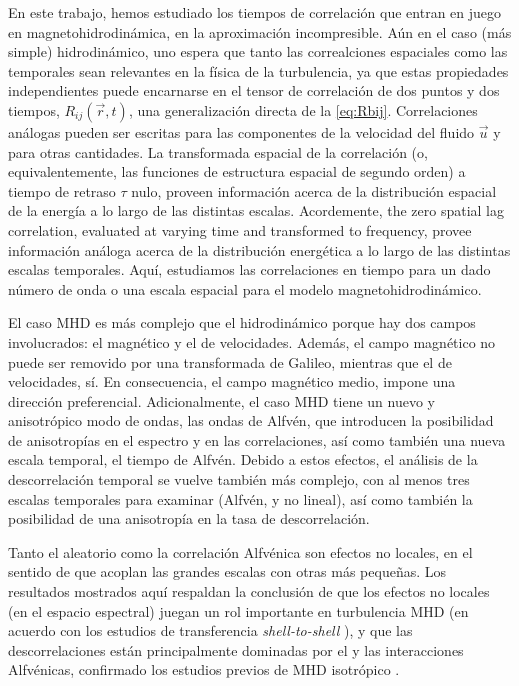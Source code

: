 En este trabajo, hemos estudiado los tiempos de correlación que entran
en juego en magnetohidrodinámica, en la aproximación
incompresible. Aún en el caso (más simple) hidrodinámico, uno espera
que tanto las correalciones espaciales como las temporales sean
relevantes en la física de la turbulencia, ya que estas propiedades
independientes puede encarnarse en el tensor de correlación de dos
puntos y dos tiempos, $R_{ij}(\vec{r},t)$, una generalización directa
de la \cref{eq:Rbij}. Correlaciones análogas pueden ser escritas para
las componentes de la velocidad del fluido $\vec{u}$ y para otras
cantidades.  La transformada espacial de la correlación (o,
equivalentemente, las funciones de estructura espacial de segundo
orden) a tiempo de retraso $\tau$ nulo, proveen información acerca de
la distribución espacial de la energía a lo largo de las distintas
escalas. Acordemente, {\color{red}the zero spatial lag correlation,
  evaluated at varying time and transformed to frequency}, provee
información análoga acerca de la distribución energética a lo largo de
las distintas escalas temporales. Aquí, estudiamos las correlaciones
en tiempo para un dado número de onda o una escala espacial para el
modelo magnetohidrodinámico.

El caso MHD es más complejo que el hidrodinámico porque hay dos campos
involucrados: el magnético y el de velocidades. Además, el campo
magnético no puede ser removido por una transformada de Galileo,
mientras que el de velocidades, sí.  En consecuencia, el campo
magnético medio, impone una dirección preferencial. Adicionalmente, el
caso MHD tiene un nuevo y anisotrópico modo de ondas, las ondas de
Alfvén, que introducen la posibilidad de anisotropías en el espectro y
en las correlaciones, así como también una nueva escala temporal, el
tiempo de Alfvén. Debido a estos efectos, el análisis de la
descorrelación temporal se vuelve también más complejo, con al menos
tres escalas temporales para examinar (Alfvén, \sweeping y no lineal),
así como también la posibilidad de una anisotropía en la tasa de
descorrelación.

Tanto el \sweeping aleatorio como la correlación Alfvénica son efectos
no locales, en el sentido de que acoplan las grandes escalas con otras
más pequeñas. Los resultados mostrados aquí respaldan la conclusión de
que los efectos no locales (en el espacio espectral) juegan un rol
importante en turbulencia MHD (en acuerdo con los estudios de
transferencia \textit{shell-to-shell} \cite{alexakis_turbulent_2007,
  alexakis_anisotropic_2007, teaca_energy_2009, mininni_scale_2011}),
y que las descorrelaciones están principalmente dominadas por el
\sweeping y las interacciones Alfvénicas, confirmado los estudios
previos de MHD isotrópico \cite{servidio_time_2011}.

